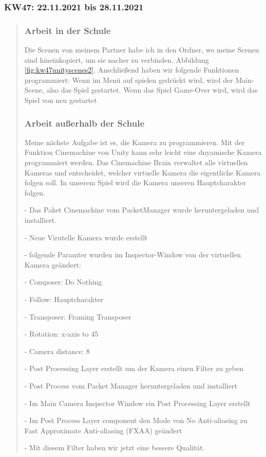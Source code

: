 

\subsubsection{KW47: 22.11.2021 bis 28.11.2021}
\begin{quote}

	\subsubsection*{Arbeit in der Schule}
		Die Scenen von meinem Partner habe ich in den Ordner, wo meine Scenen sind hineinkopiert, um sie nacher zu verbinden. Abbildung \ref{fig:kw47unityscenes2}.
		Anschließend haben wir folgende Funktionen programmiert: Wenn im Menü auf spielen gedrückt wird, wird der Main-Scene, also das Spiel gestartet. Wenn das Spiel Game-Over wird, wird das Spiel von neu gestartet
	
	\subsubsection*{Arbeit außerhalb der Schule}
	Meine nächste Aufgabe ist es, die Kamera zu programmieren. Mit der Funktion Cinemachine von Unity kann sehr leicht eine dnyamische Kamera programmiert werden. Das Cinemachine Brain verwaltet alle virtuellen Kameras und entscheidet, welcher virtuelle Kamera die eigentliche Kamera folgen soll. In unserem Spiel wird die Kamera unseren Hauptcharakter folgen.
	
	- Das Paket Cinemachine vom PacketManager wurde heruntergeladen und installiert.
	
	- Neue Virutelle Kamera wurde erstellt
	
	- folgende Paramter wurden im Inspector-Window von der virtuellen Kamera geändert:
	
		- Composer: Do Nothing
		
		- Follow: Hauptcharakter
		
		- Transposer: Framing Transposer
		
		- Rotation: x-axis to 45
		
		- Camera distance: 8
		
	- Post Processing Layer erstellt um der Kamera einen Filter zu geben
	
		- Post Process vom Packet Manager heruntergeladen und installiert
		
		- Im Main Camera Inspector Window ein Post Processing Layer erstellt
		
		- Im Post Process Layer component den Mode von No Anti-aliasing zu Fast Approximate Anti-aliasing (FXAA) geändert
		
	- Mit diesem Filter haben wir jetzt eine bessere Qualität.

\end{quote}


